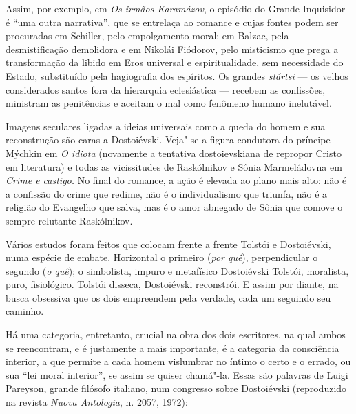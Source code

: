 Assim, por exemplo, em \emph{Os irmãos Karamázov}, o episódio do Grande
Inquisidor é ``uma outra narrativa'', que se entrelaça ao romance e
cujas fontes podem ser procuradas em Schiller, pelo empolgamento moral;
em Balzac, pela desmistificação demolidora e em Nikolái Fiódorov, pelo
misticismo que prega a transformação da libido em Eros universal e
espiritualidade, sem necessidade do Estado, substituído pela hagiografia
dos espíritos. Os grandes \emph{stártsi} --- os velhos considerados
santos fora da hierarquia eclesiástica --- recebem as confissões, ministram as penitências e aceitam o mal
como fenômeno humano inelutável.

Imagens seculares ligadas a ideias universais como a queda do homem e
sua reconstrução são caras a Dostoiévski. Veja"-se a figura condutora do
príncipe Mýchkin em \emph{O idiota} (novamente a tentativa
dostoievskiana de repropor Cristo em literatura) e todas as vicissitudes
de Raskólnikov e Sônia Marmeládovna em \emph{Crime e castigo.} No final
do romance, a ação é elevada ao plano mais alto: não é a confissão do
crime que redime, não é o individualismo que triunfa, não é a religião
do Evangelho que salva, mas é o amor abnegado de Sônia que comove o
sempre relutante Raskólnikov.

Vários estudos foram feitos que colocam frente a frente Tolstói e
Dostoiévski, numa espécie de embate. Horizontal o primeiro (\emph{por quê}),
perpendicular o segundo (\emph{o quê}); o simbolista, impuro e metafísico
Dostoiévski  Tolstói, moralista, puro, fisiológico. Tolstói disseca, Dostoiévski reconstrói. E assim por diante,
na busca obsessiva que os dois empreendem pela verdade, cada um seguindo
seu caminho.

Há uma categoria, entretanto, crucial na obra dos dois escritores, na
qual ambos se reencontram, e é justamente a mais importante, é a
categoria da consciência interior, a que permite a cada homem vislumbrar
no íntimo o certo e o errado, ou sua ``lei moral interior'', se assim
se quiser chamá"-la. Essas são palavras de Luigi Pareyson, grande
filósofo italiano, num congresso sobre Dostoiévski (reproduzido na
revista \emph{Nuova Antologia}, n. 2057, 1972):

